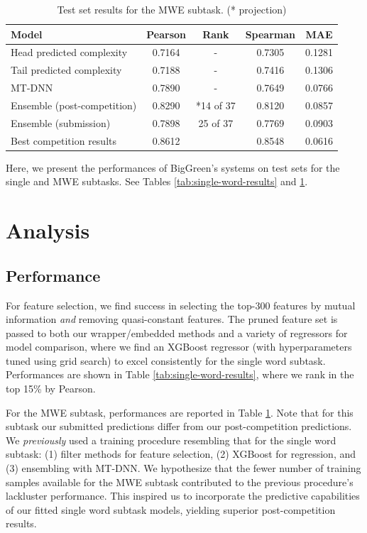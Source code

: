 \documentclass[11pt,a4paper]{article}
\begin{document}
\begin{table}[t]
  \centering
  \begin{tabular}{lcccc}
  \hline \textbf{Model} & \textbf{Pearson} & \textbf{Rank} & \textbf{Spearman} & \textbf{MAE} \\ \hline
  Head predicted complexity & 0.7164 & - & 0.7305 & 0.1281 \\
  Tail predicted complexity & 0.7188 & - & 0.7416 & 0.1306 \\
  MT-DNN & 0.7890 & - & 0.7649 & 0.0766 \\
  Ensemble (post-competition) & 0.8290 & *14 of 37 & 0.8120 & 0.0857 \\
  Ensemble (submission) & 0.7898 & 25 of 37 & 0.7769 & 0.0903 \\
  \hline
  Best competition results & 0.8612 & &  0.8548 & 0.0616 \\ 
  \hline
  \end{tabular}
  \caption{\label{tab:multi-word-results} Test set results for the MWE subtask. (* projection)}
\end{table}

Here, we present the performances of BigGreen's systems on test sets for the single and MWE subtasks. See Tables \ref{tab:single-word-results} and \ref{tab:multi-word-results}.

\section{Analysis}

\subsection{Performance}

For feature selection, we find success in selecting the top-300 features by mutual information \textit{and} removing quasi-constant features. The pruned feature set is passed to both our wrapper/embedded methods and a variety of regressors for model comparison, where we find an XGBoost regressor \citep{DBLP:journals/corr/ChenG16} (with hyperparameters tuned using grid search) to excel consistently for the single word subtask. Performances are shown in Table \ref{tab:single-word-results}, where we rank in the top 15\% by Pearson. 

For the MWE subtask, performances are reported in Table \ref{tab:multi-word-results}. Note that for this subtask our submitted predictions differ from our post-competition predictions. We \textit{previously} used a training procedure resembling that for the single word subtask: (1) filter methods for feature selection, (2) XGBoost for regression, and (3) ensembling with MT-DNN. We hypothesize that the fewer number of training samples available for the MWE subtask contributed to the previous procedure's lackluster performance. This inspired us to incorporate the predictive capabilities of our fitted single word subtask models, yielding superior post-competition results.
\end{document}
